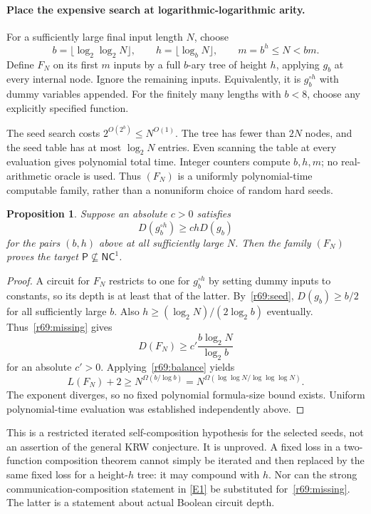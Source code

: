 \documentclass[11pt,a4paper]{article}
\newcommand{\eref}[2]{\hyperlink{extra:#1:#2}{[E#2]}}
\newtheorem{notebookproposition}[notebooklemma]{Proposition}
\numberwithin{equation}{section}
\begin{document}
\paragraph{Place the expensive search at logarithmic-logarithmic arity.}
For a sufficiently large final input length $N$, choose
\[
 b=\lfloor\log_2\log_2N\rfloor,\qquad
 h=\lfloor\log_b N\rfloor,
 \qquad m=b^h\le N<bm.
\]
Define $F_N$ on its first $m$ inputs by a full $b$-ary tree of height $h$, applying $g_b$ at every internal node. Ignore the remaining inputs. Equivalently, it is $g_b^{\circ h}$ with dummy variables appended. For the finitely many lengths with $b<8$, choose any explicitly specified function.

The seed search costs $2^{O(2^b)}\le N^{O(1)}$. The tree has fewer than $2N$ nodes, and the seed table has at most $\log_2N$ entries. Even scanning the table at every evaluation gives polynomial total time. Integer counters compute $b,h,m$; no real-arithmetic oracle is used. Thus $(F_N)$ is a uniformly polynomial-time computable family, rather than a nonuniform choice of random hard seeds.

\begin{notebookproposition}\label{r69:conditional}
Suppose an absolute $c>0$ satisfies
\begin{equation}\label{r69:missing}
 D(g_b^{\circ h})\ge c h D(g_b)
\end{equation}
for the pairs $(b,h)$ above at all sufficiently large $N$. Then the family $(F_N)$ proves the target $\mathsf P\nsubseteq\mathsf{NC}^1$.
\end{notebookproposition}
\begin{proof}
A circuit for $F_N$ restricts to one for $g_b^{\circ h}$ by setting dummy inputs to constants, so its depth is at least that of the latter. By~\eqref{r69:seed}, $D(g_b)\ge b/2$ for all sufficiently large $b$. Also $h\ge(\log_2N)/(2\log_2b)$ eventually. Thus~\eqref{r69:missing} gives
\[
 D(F_N)\ge c'\frac{b\log_2N}{\log_2b}
\]
for an absolute $c'>0$. Applying~\eqref{r69:balance} yields
\begin{equation}\label{r69:lower}
 L(F_N)+2\ge
 N^{\Omega(b/\log b)}
 =N^{\Omega(\log\log N/\log\log\log N)}.
\end{equation}
The exponent diverges, so no fixed polynomial formula-size bound exists. Uniform polynomial-time evaluation was established independently above.
\end{proof}

This is a restricted iterated self-composition hypothesis for the selected seeds, not an assertion of the general KRW conjecture. It is unproved. A fixed loss in a two-function composition theorem cannot simply be iterated and then replaced by the same fixed loss for a height-$h$ tree: it may compound with $h$. Nor can the strong communication-composition statement in \eref{69}{1} be substituted for~\eqref{r69:missing}. The latter is a statement about actual Boolean circuit depth.
\end{document}
